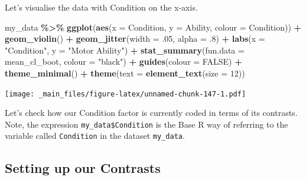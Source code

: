 \documentclass[
]{book}
\newenvironment{Shaded}{\begin{snugshade}}{\end{snugshade}}
\newcommand{\AttributeTok}[1]{\textcolor[rgb]{0.13,0.29,0.53}{#1}}
\newcommand{\ConstantTok}[1]{\textcolor[rgb]{0.56,0.35,0.01}{#1}}
\newcommand{\DecValTok}[1]{\textcolor[rgb]{0.00,0.00,0.81}{#1}}
\newcommand{\FunctionTok}[1]{\textcolor[rgb]{0.13,0.29,0.53}{\textbf{#1}}}
\newcommand{\NormalTok}[1]{#1}
\newcommand{\SpecialCharTok}[1]{\textcolor[rgb]{0.81,0.36,0.00}{\textbf{#1}}}
\newcommand{\StringTok}[1]{\textcolor[rgb]{0.31,0.60,0.02}{#1}}
\begin{document}
Let's visualise the data with Condition on the x-axis.

\begin{Shaded}
\begin{Highlighting}[]
\NormalTok{my\_data }\SpecialCharTok{\%\textgreater{}\%}
  \FunctionTok{ggplot}\NormalTok{(}\FunctionTok{aes}\NormalTok{(}\AttributeTok{x =}\NormalTok{ Condition, }\AttributeTok{y =}\NormalTok{ Ability, }\AttributeTok{colour =}\NormalTok{ Condition)) }\SpecialCharTok{+}
  \FunctionTok{geom\_violin}\NormalTok{() }\SpecialCharTok{+}
  \FunctionTok{geom\_jitter}\NormalTok{(}\AttributeTok{width =}\NormalTok{ .}\DecValTok{05}\NormalTok{, }\AttributeTok{alpha =}\NormalTok{ .}\DecValTok{8}\NormalTok{) }\SpecialCharTok{+}
  \FunctionTok{labs}\NormalTok{(}\AttributeTok{x =} \StringTok{"Condition"}\NormalTok{, }
       \AttributeTok{y =} \StringTok{"Motor Ability"}\NormalTok{) }\SpecialCharTok{+}
  \FunctionTok{stat\_summary}\NormalTok{(}\AttributeTok{fun.data =}\NormalTok{ mean\_cl\_boot, }\AttributeTok{colour =} \StringTok{"black"}\NormalTok{) }\SpecialCharTok{+}
  \FunctionTok{guides}\NormalTok{(}\AttributeTok{colour =} \ConstantTok{FALSE}\NormalTok{) }\SpecialCharTok{+}
  \FunctionTok{theme\_minimal}\NormalTok{() }\SpecialCharTok{+}
  \FunctionTok{theme}\NormalTok{(}\AttributeTok{text =} \FunctionTok{element\_text}\NormalTok{(}\AttributeTok{size =} \DecValTok{12}\NormalTok{)) }
\end{Highlighting}
\end{Shaded}

\texttt{[image: \_main\_files/figure-latex/unnamed-chunk-147-1.pdf]}

Let's check how our Condition factor is currently coded in terms of its contrasts. Note, the expression \texttt{my\_data\$Condition} is the Base R way of referring to the variable called \texttt{Condition} in the dataset \texttt{my\_data}.

\hypertarget{setting-up-our-contrasts}{%
\subsection{Setting up our Contrasts}\label{setting-up-our-contrasts}}

\begin{Shaded}
\end{Shaded}
\end{document}
